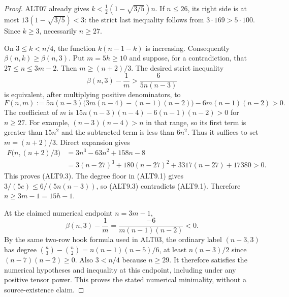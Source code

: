 \begin{proof}
ALT07 already gives
$k<\tfrac12(1-\sqrt{3/5})n$. If $n\le26$, its right side is
at most $13(1-\sqrt{3/5})<3$: the strict last inequality follows
from $3\cdot169>5\cdot100$. Since $k\ge3$, necessarily
$n\ge27$.

On $3\le k<n/4$, the function $k(n-1-k)$ is increasing.
Consequently $\beta(n,k)\ge\beta(n,3)$.
Put $m=5h\ge10$ and suppose, for a contradiction, that
$27\le n\le3m-2$. Then $m\ge(n+2)/3$.
The desired strict inequality
\[
 \beta(n,3)-\frac1m>\frac6{5n(n-3)}                     \tag{ALT9.3}
\]
is equivalent, after multiplying positive denominators, to
\[
 F(n,m):=5n(n-3)\bigl(3m(n-4)-(n-1)(n-2)\bigr)
              -6m(n-1)(n-2)>0.                         \tag{ALT9.4}
\]
The coefficient of $m$ is
$15n(n-3)(n-4)-6(n-1)(n-2)>0$ for $n\ge27$.
For example, $(n-3)(n-4)>n$ in that range, so its first
term is greater than $15n^2$ and the subtracted term is
less than $6n^2$.
Thus it suffices to set $m=(n+2)/3$. Direct expansion gives
\[
 \begin{split}
 F\bigl(n,(n+2)/3\bigr)
  &=3n^3-63n^2+158n-8\\
  &=3(n-27)^3+180(n-27)^2+3317(n-27)+17380>0.
 \end{split}                                             \tag{ALT9.5}
\]
This proves (ALT9.3). The degree floor in (ALT9.1) gives
$3/(5e)\le6/(5n(n-3))$, so (ALT9.3) contradicts (ALT9.1).
Therefore $n\ge3m-1=15h-1$.

At the claimed numerical endpoint $n=3m-1$,
\[
 \beta(n,3)-\frac1m
             =\frac{-6}{m(n-1)(n-2)}<0.                 \tag{ALT9.6}
\]
By the same two-row hook formula used in ALT03,
the ordinary label $(n-3,3)$ has degree
$\binom n3-\binom n2=n(n-1)(n-5)/6$, at least
$n(n-3)/2$ since $(n-7)(n-2)\ge0$.
Also $3<n/4$ because $n\ge29$. It therefore satisfies
the numerical hypotheses and inequality at this endpoint,
including under any positive tensor power. This proves
the stated numerical minimality, without a source-existence claim.
\end{proof}

